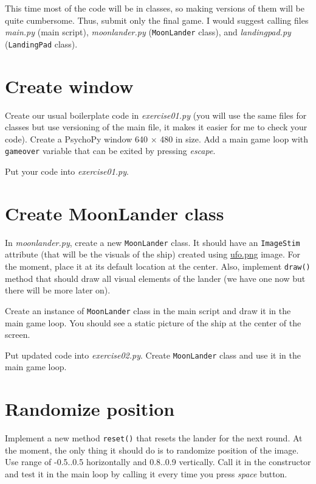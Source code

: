 \documentclass[
]{book}
\begin{document}
This time most of the code will be in classes, so making versions of them will be quite cumbersome. Thus, submit only the final game. I would suggest calling files \emph{main.py} (main script), \emph{moonlander.py} (\texttt{MoonLander} class), and \emph{landingpad.py} (\texttt{LandingPad} class).

\hypertarget{create-window}{%
\section{Create window}\label{create-window}}

Create our usual boilerplate code in \emph{exercise01.py} (you will use the same files for classes but use versioning of the main file, it makes it easier for me to check your code). Create a PsychoPy window 640 × 480 in size. Add a main game loop with \texttt{gameover} variable that can be exited by pressing \emph{escape}.

Put your code into \emph{exercise01.py}.

\hypertarget{create-moonlander-class}{%
\section{Create MoonLander class}\label{create-moonlander-class}}

In \emph{moonlander.py}, create a new \texttt{MoonLander} class. It should have an \texttt{ImageStim} attribute (that will be the visuals of the ship) created using \href{material/ufo.png}{ufo.png} image. For the moment, place it at its default location at the center. Also, implement \texttt{draw()} method that should draw all visual elements of the lander (we have one now but there will be more later on).

Create an instance of \texttt{MoonLander} class in the main script and draw it in the main game loop. You should see a static picture of the ship at the center of the screen.

Put updated code into \emph{exercise02.py}. Create \texttt{MoonLander} class and use it in the main game loop.

\hypertarget{randomize-position}{%
\section{Randomize position}\label{randomize-position}}

Implement a new method \texttt{reset()} that resets the lander for the next round. At the moment, the only thing it should do is to randomize position of the image. Use range of -0.5..0.5 horizontally and 0.8..0.9 vertically. Call it in the constructor and test it in the main loop by calling it every time you press \emph{space} button.
\end{document}
